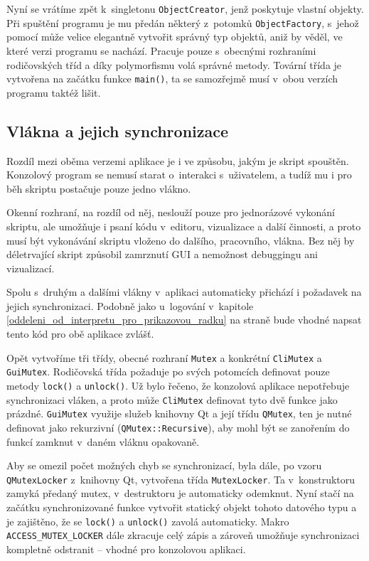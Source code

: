 \documentclass[11pt,twoside,a4paper]{book}
\begin{document}
Nyní se vrátíme zpět k~singletonu \texttt{ObjectCreator}, jenž poskytuje vlastní objekty. Při spuštění programu je mu předán některý z~potomků \texttt{ObjectFactory}, s~jehož pomocí může velice elegantně vytvořit správný typ objektů, aniž by věděl, ve které verzi programu se nachází. Pracuje pouze s~obecnými rozhraními rodičovských tříd a díky polymorfismu volá správné metody. Tovární třída je vytvořena na začátku funkce \texttt{main()}, ta se samozřejmě musí v~obou verzích programu taktéž lišit.


\subsection{Vlákna a jejich synchronizace}

Rozdíl mezi oběma verzemi aplikace je i ve způsobu, jakým je skript spouštěn. Konzolový program se nemusí starat o~interakci s~uživatelem, a tudíž mu i pro běh skriptu postačuje pouze jedno vlákno.

Okenní rozhraní, na rozdíl od něj, neslouží pouze pro jednorázové vykonání skriptu, ale umožňuje i psaní kódu v~editoru, vizualizace a další činnosti, a proto musí být vykonávání skriptu vloženo do dalšího, pracovního, vlákna. Bez něj by déletrvající skript způsobil zamrznutí GUI a nemožnost debuggingu ani vizualizací.

Spolu s~druhým a dalšími vlákny v~aplikaci automaticky přichází i požadavek na jejich synchronizaci. Podobně jako u~logování v~kapitole \ref{oddeleni_od_interpretu_pro_prikazovou_radku} na straně \pageref{oddeleni_od_interpretu_pro_prikazovou_radku} bude vhodné napsat tento kód pro obě aplikace zvlášť.

Opět vytvoříme tři třídy, obecné rozhraní \texttt{Mutex} a konkrétní \texttt{CliMutex} a \texttt{GuiMutex}. Ro\-di\-čov\-ská třída požaduje po svých potomcích definovat pouze metody \texttt{lock()} a \texttt{unlock()}. Už bylo řečeno, že konzolová aplikace nepotřebuje synchronizaci vláken, a proto může \texttt{CliMutex} definovat tyto dvě funkce jako prázdné. \texttt{GuiMutex} využije služeb knihovny Qt a její třídu \texttt{QMutex}, ten je nutné definovat jako rekurzivní (\texttt{QMutex::Recursive}), aby mohl být se zanořením do funkcí zamknut v~daném vláknu opakovaně.

Aby se omezil počet možných chyb se synchronizací, byla dále, po vzoru \texttt{QMu\-tex\-Loc\-ker} z~knihovny Qt, vytvořena třída \texttt{MutexLocker}. Ta v~konstruktoru zamyká předaný mutex, v~destruktoru je automaticky odemknut. Nyní stačí na začátku synchronizované funkce vytvořit statický objekt tohoto datového typu a je zajištěno, že se \texttt{lock()} a \texttt{unlock()} zavolá automaticky. Makro \texttt{ACCESS\_MUTEX\_LOCKER} dále zkracuje celý zápis a zároveň umožňuje synchronizaci kompletně odstranit -- vhodné pro konzolovou aplikaci.
\end{document}
